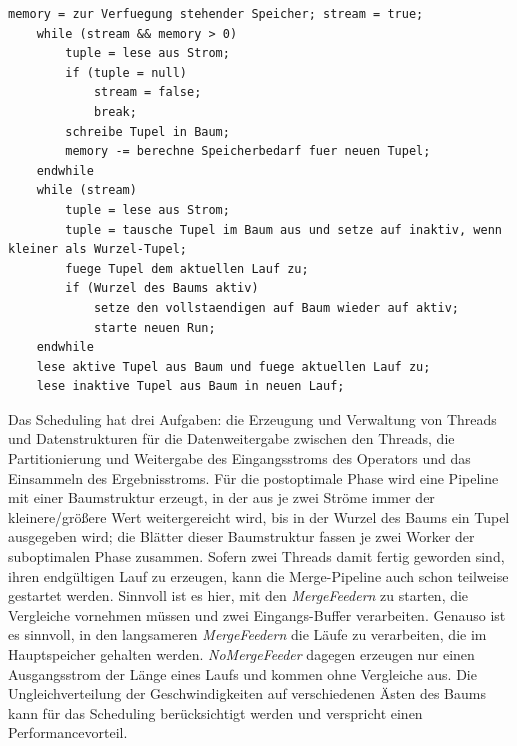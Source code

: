 \documentclass[a4paper,12pt,twoside]{article}
\newcommand{\Fb}[1]{\textit{#1}} %
\begin{document}
\begin{minipage}{0.95\textwidth}
	\begin{lstlisting}[caption={Fastsort: Erzeugen der Runs in der Suboptimalen Phase.}, label=list:fastsortSub]
	memory = zur Verfuegung stehender Speicher; stream = true; 
	while (stream && memory > 0) 
		tuple = lese aus Strom;
		if (tuple = null)
			stream = false;
			break;
		schreibe Tupel in Baum;
		memory -= berechne Speicherbedarf fuer neuen Tupel;
	endwhile
	while (stream)
		tuple = lese aus Strom;
		tuple = tausche Tupel im Baum aus und setze auf inaktiv, wenn kleiner als Wurzel-Tupel;
		fuege Tupel dem aktuellen Lauf zu;
		if (Wurzel des Baums aktiv)
			setze den vollstaendigen auf Baum wieder auf aktiv;
			starte neuen Run;
	endwhile
	lese aktive Tupel aus Baum und fuege aktuellen Lauf zu;
	lese inaktive Tupel aus Baum in neuen Lauf;
	\end{lstlisting}
\end{minipage}

Das Scheduling hat drei Aufgaben: die Erzeugung und Verwaltung von Threads und Datenstrukturen für die Datenweitergabe zwischen den Threads, die Partitionierung und Weitergabe des Eingangsstroms des Operators und das Einsammeln des Ergebnisstroms. Für die postoptimale Phase wird eine Pipeline mit einer Baumstruktur erzeugt, in der aus je zwei Ströme immer der kleinere/größere Wert weitergereicht wird, bis in der Wurzel des Baums ein Tupel ausgegeben wird; die Blätter dieser Baumstruktur fassen je zwei Worker der suboptimalen Phase zusammen. Sofern zwei Threads damit fertig geworden sind, ihren endgültigen Lauf zu erzeugen, kann die Merge-Pipeline auch schon teilweise gestartet werden. Sinnvoll ist es hier, mit den \Fb{MergeFeedern} zu starten, die Vergleiche vornehmen müssen und zwei Eingangs-Buffer verarbeiten. Genauso ist es sinnvoll, in den langsameren \Fb{MergeFeedern} die Läufe zu verarbeiten, die im Hauptspeicher gehalten werden. \Fb{NoMergeFeeder} dagegen erzeugen nur einen Ausgangsstrom der Länge eines Laufs und kommen ohne Vergleiche aus. Die Ungleichverteilung der Geschwindigkeiten auf verschiedenen Ästen des Baums kann für das Scheduling berücksichtigt werden und verspricht einen Performancevorteil.
\end{document}

